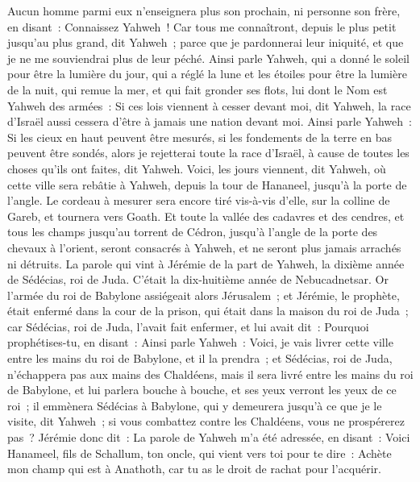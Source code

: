 \begin{multicols}{2}
Aucun homme parmi eux n'enseignera plus son prochain, ni personne son frère, en disant~: Connaissez Yahweh~! Car tous me connaîtront, depuis le plus petit jusqu'au plus grand, dit Yahweh~; parce que je pardonnerai leur iniquité, et que je ne me souviendrai plus de leur péché.
Ainsi parle Yahweh, qui a donné le soleil pour être la lumière du jour, qui a réglé la lune et les étoiles pour être la lumière de la nuit, qui remue la mer, et qui fait gronder ses flots, lui dont le Nom est Yahweh des armées~:
Si ces lois viennent à cesser devant moi, dit Yahweh, la race d'Israël aussi cessera d'être à jamais une nation devant moi.
Ainsi parle Yahweh~: Si les cieux en haut peuvent être mesurés, si les fondements de la terre en bas peuvent être sondés, alors je rejetterai toute la race d'Israël, à cause de toutes les choses qu'ils ont faites, dit Yahweh.
Voici, les jours viennent, dit Yahweh, où cette ville sera rebâtie à Yahweh, depuis la tour de Hananeel, jusqu'à la porte de l'angle.
Le cordeau à mesurer sera encore tiré vis-à-vis d'elle, sur la colline de Gareb, et tournera vers Goath.
Et toute la vallée des cadavres et des cendres, et tous les champs jusqu'au torrent de Cédron, jusqu'à l'angle de la porte des chevaux à l'orient, seront consacrés à Yahweh, et ne seront plus jamais arrachés ni détruits.
\VerseOne{}La parole qui vint à Jérémie de la part de Yahweh, la dixième année de Sédécias, roi de Juda. C'était la dix-huitième année de Nebucadnetsar.
Or l'armée du roi de Babylone assiégeait alors Jérusalem~; et Jérémie, le prophète, était enfermé dans la cour de la prison, qui était dans la maison du roi de Juda~;
car Sédécias, roi de Juda, l'avait fait enfermer, et lui avait dit~: Pourquoi prophétises-tu, en disant~: Ainsi parle Yahweh~: Voici, je vais livrer cette ville entre les mains du roi de Babylone, et il la prendra~;
et Sédécias, roi de Juda, n'échappera pas aux mains des Chaldéens, mais il sera livré entre les mains du roi de Babylone, et lui parlera bouche à bouche, et ses yeux verront les yeux de ce roi~;
il emmènera Sédécias à Babylone, qui y demeurera jusqu'à ce que je le visite, dit Yahweh~; si vous combattez contre les Chaldéens, vous ne prospérerez pas~?
Jérémie donc dit~: La parole de Yahweh m'a été adressée, en disant~:
Voici Hanameel, fils de Schallum, ton oncle, qui vient vers toi pour te dire~: Achète mon champ qui est à Anathoth, car tu as le droit de rachat pour l'acquérir.

\end{multicols}
